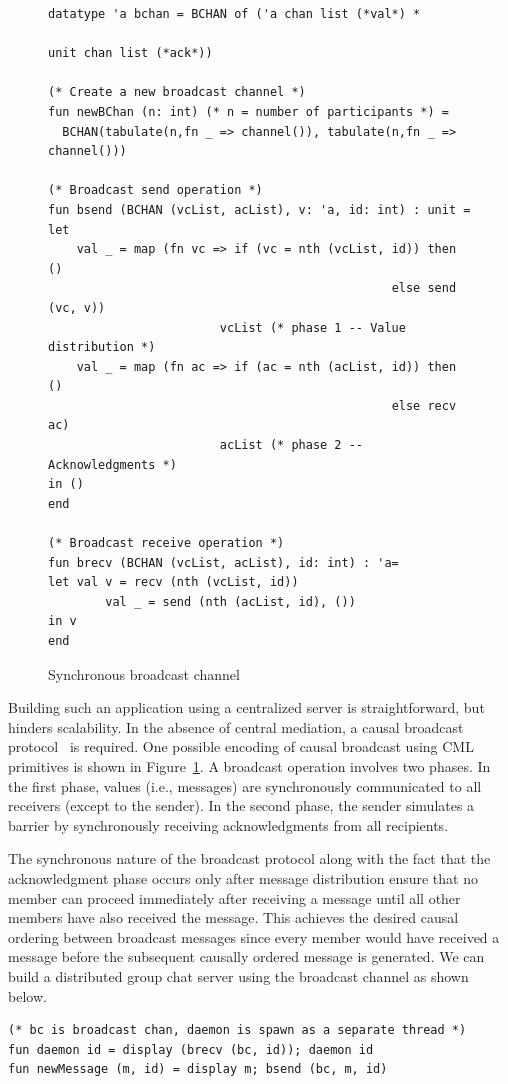 \begin{figure}[t]
\begin{lstlisting}
datatype 'a bchan = BCHAN of ('a chan list (*val*) *
															unit chan list (*ack*))

(* Create a new broadcast channel *)
fun newBChan (n: int) (* n = number of participants *) =
  BCHAN(tabulate(n,fn _ => channel()), tabulate(n,fn _ => channel()))

(* Broadcast send operation *)
fun bsend (BCHAN (vcList, acList), v: 'a, id: int) : unit =
let
	val _ = map (fn vc => if (vc = nth (vcList, id)) then ()
												else send (vc, v))
						vcList (* phase 1 -- Value distribution *)
	val _ = map (fn ac => if (ac = nth (acList, id)) then ()
												else recv ac)
						acList (* phase 2 -- Acknowledgments *)
in ()
end

(* Broadcast receive operation *)
fun brecv (BCHAN (vcList, acList), id: int) : 'a=
let val v = recv (nth (vcList, id))
		val _ = send (nth (acList, id), ())
in v
end
\end{lstlisting}
\caption{Synchronous broadcast channel}
\label{code:bchan}
\end{figure}

Building such an application using a centralized server is straightforward, but
hinders scalability. In the absence of central mediation, a causal broadcast
protocol~\cite{Birman87} is required. One possible encoding of causal broadcast
using CML primitives is shown in Figure~\ref{code:bchan}. A broadcast operation
involves two phases.  In the first phase, values (i.e., messages) are
synchronously communicated to all receivers (except to the sender).  In the
second phase, the sender simulates a barrier by synchronously receiving
acknowledgments from all recipients.

The synchronous nature of the broadcast protocol along with the fact that the
acknowledgment phase occurs only after message distribution ensure that no
member can proceed immediately after receiving a message until all other
members have also received the message. This achieves the desired causal
ordering between broadcast messages since every member would have received a
message before the subsequent causally ordered message is generated. We can
build a distributed group chat server using the broadcast channel as shown
below.

\lstset{numbers=none}
\begin{lstlisting}
(* bc is broadcast chan, daemon is spawn as a separate thread *)
fun daemon id = display (brecv (bc, id)); daemon id
fun newMessage (m, id) = display m; bsend (bc, m, id)
\end{lstlisting}
\lstset{numbers=left,numberstyle=\tiny,stepnumber=1}

